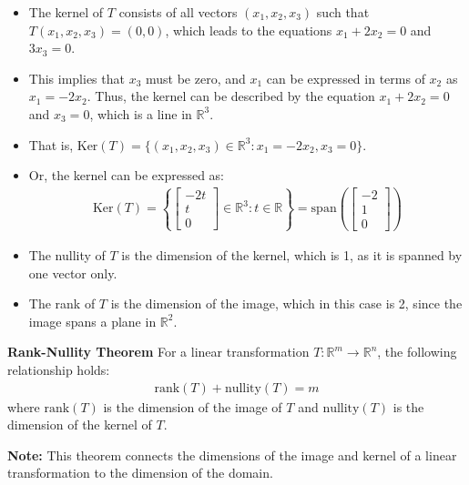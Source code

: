 \begin{frame}
    \begin{itemize}
        \item The kernel of $T$ consists of all vectors $(x_1, x_2, x_3)$ such that $T(x_1, x_2, x_3) = (0, 0)$, which leads to the equations $x_1 + 2x_2 = 0$ and $3x_3 = 0$.
        \item This implies that $x_3$ must be zero, and $x_1$ can be expressed in terms of $x_2$ as $x_1 = -2x_2$. Thus, the kernel can be described by the equation $x_1 + 2x_2 = 0$ and $x_3 = 0$, which is a line in $\mathbb{R}^3$.
        \item That is, $\text{Ker}(T) =  \{ ( x_1, x_2, x_3 ) \in \mathbb{R}^3 : x_1 = -2x_2, x_3 = 0\} $.
        \item  Or, the kernel can be expressed as:
        \begin{align*}
            \text{Ker}(T) = \left \{\begin{bmatrix} -2t\\ t\\ 0 \end{bmatrix} \in \mathbb{R}^3: t \in \mathbb{R} \right \} = \text{span}\left(\begin{bmatrix} -2\\ 1\\ 0 \end{bmatrix}\right)
        \end{align*}        
    \end{itemize}
\end{frame}
\begin{frame}
    \begin{itemize}
        \item The nullity of $T$ is the dimension of the kernel, which is 1, as it is spanned by one vector only.
        \item The rank of $T$ is the dimension of the image, which in this case is 2, since the image spans a plane in $\mathbb{R}^2$.
    \end{itemize}
\end{frame}


\begin{frame}
    \begin{block}{\textbf{Rank-Nullity Theorem}}
        For a linear transformation $T:\mathbb{R}^m \rightarrow \mathbb{R}^n$, the following relationship holds:
        \begin{align*}
            \text{rank}(T) + \text{nullity}(T) = m
        \end{align*}
        where $\text{rank}(T)$ is the dimension of the image of $T$ and $\text{nullity}(T)$ is the dimension of the kernel of $T$.
    \end{block}
     \textbf{Note:} This theorem connects the dimensions of the image and kernel of a linear transformation to the dimension of the domain.
\end{frame}

